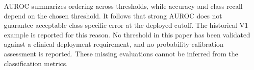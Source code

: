 AUROC summarizes ordering across thresholds, while accuracy and class recall depend on the chosen threshold. It follows that strong AUROC does not guarantee acceptable class-specific error at the deployed cutoff. The historical V1 example is reported for this reason. No threshold in this paper has been validated against a clinical deployment requirement, and no probability-calibration assessment is reported. These missing evaluations cannot be inferred from the classification metrics.

